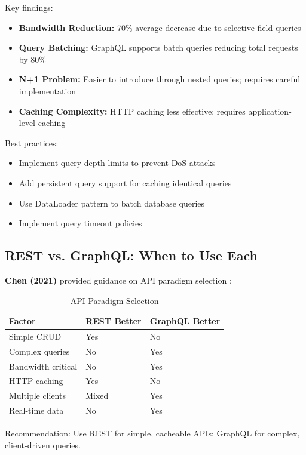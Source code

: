 \documentclass[conference]{IEEEtran}
\begin{document}
Key findings:
\begin{itemize}
    \item \textbf{Bandwidth Reduction:} 70\% average decrease due to selective field queries
    \item \textbf{Query Batching:} GraphQL supports batch queries reducing total requests by 80\%
    \item \textbf{N+1 Problem:} Easier to introduce through nested queries; requires careful implementation
    \item \textbf{Caching Complexity:} HTTP caching less effective; requires application-level caching
\end{itemize}

Best practices:
\begin{itemize}
    \item Implement query depth limits to prevent DoS attacks
    \item Add persistent query support for caching identical queries
    \item Use DataLoader pattern to batch database queries
    \item Implement query timeout policies
\end{itemize}

\subsection{REST vs. GraphQL: When to Use Each}

\textbf{Chen (2021)} provided guidance on API paradigm selection \cite{chen2021rest}:

\begin{table}[h]
\centering
\caption{API Paradigm Selection}
\begin{tabular}{|l|l|l|}
\hline
\textbf{Factor} & \textbf{REST Better} & \textbf{GraphQL Better} \\
\hline
Simple CRUD & Yes & No \\
Complex queries & No & Yes \\
Bandwidth critical & No & Yes \\
HTTP caching & Yes & No \\
Multiple clients & Mixed & Yes \\
Real-time data & No & Yes \\
\hline
\end{tabular}
\end{table}

Recommendation: Use REST for simple, cacheable APIs; GraphQL for complex, client-driven queries.
\end{document}
